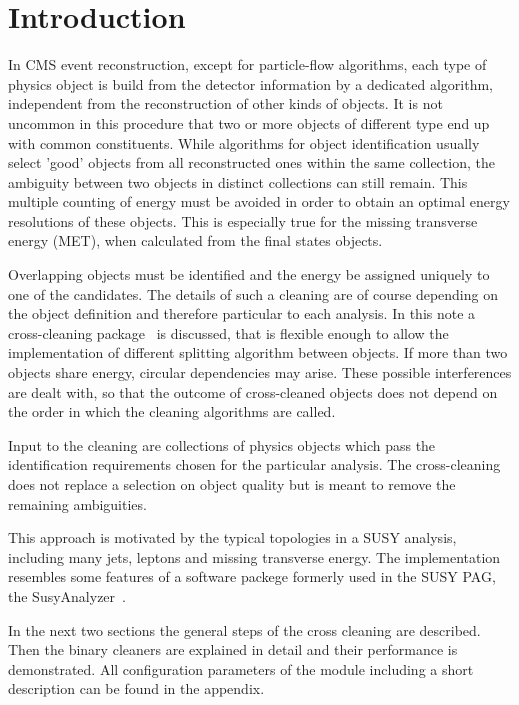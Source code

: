 \documentclass{cmspaper}
\begin{document}
\setcounter{page}{2}%


\newpage
\section{Introduction}

In CMS event reconstruction, except for particle-flow algorithms, each type of
physics object is build from the detector information by a dedicated algorithm,
independent from the reconstruction of other kinds of objects. It is not
uncommon in this procedure that two or more objects of different type end up
with common constituents.  While algorithms for object identification usually
select 'good' objects from all reconstructed ones within the same collection,
the ambiguity between two objects in distinct collections can still remain.
This multiple counting of energy must be avoided in order to obtain an optimal
energy resolutions of these objects. This is especially true for the missing
transverse energy (MET), when calculated from the final states objects.

Overlapping objects must be identified and the energy be assigned uniquely to
one of the candidates. The details of such a cleaning are of course depending on
the object definition and therefore particular to each analysis.  In this note a
cross-cleaning package~\cite{package} is discussed, that is flexible enough to
allow the implementation of different splitting algorithm between objects.
If more than two objects share energy, circular dependencies may arise. These
possible interferences are dealt with, so that the outcome of cross-cleaned
objects does not depend on the order in which the cleaning algorithms are
called.

Input to the cleaning are collections of physics objects which pass the
identification requirements chosen for the particular analysis. The
cross-cleaning does not replace a selection on object quality but is meant to
remove the remaining ambiguities.

This approach is motivated by the typical topologies in a SUSY analysis,
including many jets, leptons and missing transverse energy. The implementation
resembles some features of a software packege formerly used in the SUSY PAG,
the SusyAnalyzer~\cite{wikiSusyAnalyzer}.

In the next two sections the general steps of the cross cleaning are described.
Then the binary cleaners are explained in detail and their performance is
demonstrated. All configuration parameters of the module including a short
description can be found in the appendix.
\end{document}
